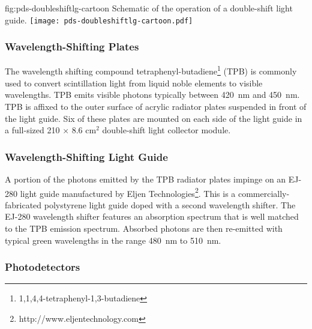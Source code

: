 \begin{dunefigure}{fig:pds-doubleshiftlg-cartoon}
{Schematic of the operation of a double-shift light guide.}
  \texttt{[image: pds-doubleshiftlg-cartoon.pdf]}
\end{dunefigure}



\subsubsection{Wavelength-Shifting Plates}

The wavelength shifting compound tetraphenyl-butadiene\footnote{1,1,4,4-tetraphenyl-1,3-butadiene} (TPB) is commonly used to convert scintillation light from liquid noble elements to visible wavelengths. TPB emits visible photons typically between 420~nm and 450~nm. TPB is affixed to the outer surface of acrylic radiator plates suspended in front of the light guide. Six of these plates are mounted on each side of the light guide in a full-sized 210 $\times$ 8.6 cm$^2$ double-shift light collector module.

\subsubsection{Wavelength-Shifting Light Guide}

A portion of the photons emitted by the TPB radiator plates impinge on an EJ-280 light guide manufactured by Eljen Technologies\footnote{http://www.eljentechnology.com}. This is a commercially-fabricated polystyrene light guide doped with a second wavelength shifter. The EJ-280 wavelength shifter features an absorption spectrum that is well matched to the TPB emission spectrum. Absorbed photons are then re-emitted with typical green wavelengths in the range 480~nm to 510~nm.

\subsubsection{Photodetectors}

